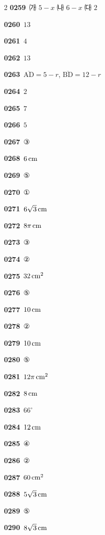 \documentclass[10pt,a4paper]{article}
\newcommand{\seg}[1]{\overline{\mathrm{#1}}}
\begin{document}
\begin{multicols}{2}
\noindent\textbf{0259}\ ㈎ $5-x$ \quad ㈏ $6-x$ \quad ㈐ $2$\par
\noindent\textbf{0260}\ $13$\par
\noindent\textbf{0261}\ $4$\par
\noindent\textbf{0262}\ $13$\par
\noindent\textbf{0263}\ $\seg{AD}=5-r$, $\seg{BD}=12-r$\par
\noindent\textbf{0264}\ $2$\par
\noindent\textbf{0265}\ $7$\par
\noindent\textbf{0266}\ $5$\par
\noindent\textbf{0267}\ ③\par
\noindent\textbf{0268}\ $6\mkern3mu \mathrm{cm}$\par
\noindent\textbf{0269}\ ⑤\par
\noindent\textbf{0270}\ ①\par
\noindent\textbf{0271}\ $6\sqrt{3}\mkern3mu \mathrm{cm}$\par
\noindent\textbf{0272}\ $8\pi\mkern3mu \mathrm{cm}$\par
\noindent\textbf{0273}\ ③\par
\noindent\textbf{0274}\ ②\par
\noindent\textbf{0275}\ $32\mkern3mu \mathrm{cm}^2$\par
\noindent\textbf{0276}\ ⑤\par
\noindent\textbf{0277}\ $10\mkern3mu \mathrm{cm}$\par
\noindent\textbf{0278}\ ②\par
\noindent\textbf{0279}\ $10\mkern3mu \mathrm{cm}$\par
\noindent\textbf{0280}\ ⑤\par
\noindent\textbf{0281}\ $12\pi\mkern3mu \mathrm{cm}^2$\par
\noindent\textbf{0282}\ $8\mkern3mu \mathrm{cm}$\par
\noindent\textbf{0283}\ $66^\circ$\par
\noindent\textbf{0284}\ $12\mkern3mu \mathrm{cm}$\par
\noindent\textbf{0285}\ ④\par
\noindent\textbf{0286}\ ②\par
\noindent\textbf{0287}\ $60\mkern3mu \mathrm{cm}^2$\par
\noindent\textbf{0288}\ $5\sqrt{3}\mkern3mu \mathrm{cm}$\par
\noindent\textbf{0289}\ ⑤\par
\noindent\textbf{0290}\ $8\sqrt{3}\mkern3mu \mathrm{cm}$\par

\end{multicols}
\end{document}
